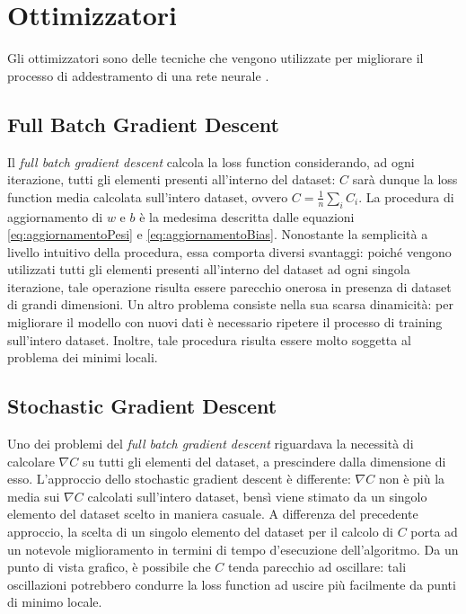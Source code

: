\section{Ottimizzatori}
Gli ottimizzatori sono delle tecniche che vengono utilizzate per migliorare il processo 
di addestramento di una rete neurale \cite{ALL_DEEP_LEARNING,LearningRate_optimizer}.

\subsection{Full Batch Gradient Descent}
Il \textit{full batch gradient descent} \cite{GradientDescent_NeuralNetworks, LearningRate_optimizer} calcola la loss function considerando, ad ogni iterazione,
tutti gli elementi presenti all’interno del dataset: $C$ sarà dunque la 
loss function media calcolata sull'intero dataset, 
ovvero $C = \frac{1}{n}\sum_{i}^{}C_i$. La procedura di aggiornamento di $w$
e $b$ è la medesima descritta dalle equazioni \eqref{eq:aggiornamentoPesi} e \eqref{eq:aggiornamentoBias}. 
Nonostante la semplicità
a livello intuitivo della procedura, essa comporta diversi svantaggi: poiché vengono
utilizzati tutti gli elementi presenti all’interno del dataset ad ogni singola iterazione, tale
operazione risulta essere parecchio onerosa in presenza di dataset di grandi dimensioni.
Un altro problema consiste nella sua scarsa dinamicità: per migliorare il modello con
nuovi dati è necessario ripetere il processo di training sull'intero dataset.
Inoltre, tale procedura risulta essere molto soggetta al problema dei minimi locali.

\subsection{Stochastic Gradient Descent}

Uno dei problemi del \textit{full batch gradient descent} \cite{GradientDescent_NeuralNetworks, LearningRate_optimizer} riguardava la necessità di 
calcolare $\nabla C$
su tutti gli elementi del dataset, a prescindere dalla dimensione di esso.
L’approccio dello stochastic gradient descent è differente: $\nabla C$ non è più la media sui
$\nabla C$ calcolati sull'intero dataset, bensì viene stimato da un singolo elemento del dataset
scelto in maniera casuale.
A differenza del precedente approccio, la scelta di un singolo elemento del dataset per
il calcolo di $C$ porta ad un notevole miglioramento in termini di tempo d’esecuzione
dell’algoritmo. Da un punto di vista grafico, è possibile che $C$ tenda parecchio ad
oscillare: tali oscillazioni potrebbero condurre la loss function ad uscire più facilmente
da punti di minimo locale.

